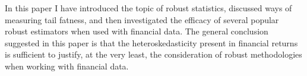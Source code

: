 \documentclass[12pt,a4paper]{amsart}
\begin{document}
In this paper I have introduced the topic of robust statistics, discussed ways of measuring tail fatness, and then investigated the efficacy of several popular robust estimators when used with financial data. The general conclusion suggested in this paper is that the heteroskedasticity present in financial returns is sufficient to justify, at the very least, the consideration of robust methodologies when working with financial data.




\clearpage
%
%

%
\end{document}
